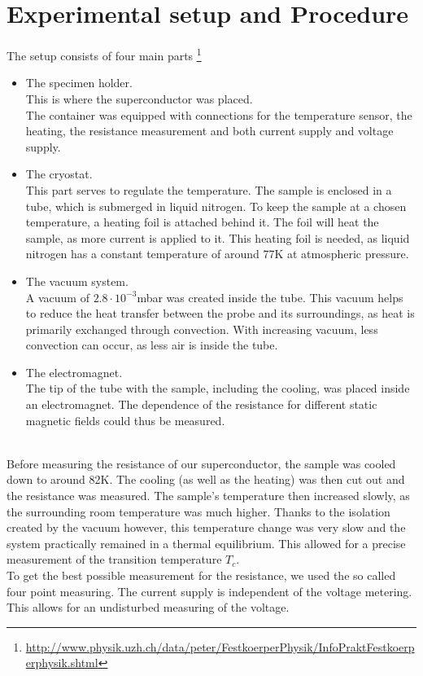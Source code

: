 \documentclass[a4paper,parskip,11pt, DIV12]{scrreprt}
\begin{document}
\chapter{Experimental setup and Procedure}
The setup consists of four main parts \footnote{\url{http://www.physik.uzh.ch/data/peter/FestkoerperPhysik/InfoPraktFestkoerperphysik.shtml}}\\
\begin{itemize}
\item The specimen holder.\\
 This is where the superconductor was placed.\\ The container was equipped with connections for the temperature sensor, the heating, the resistance measurement and both current supply and voltage supply.\\
\item The cryostat.\\
This part serves to regulate the temperature. The sample is enclosed in a tube, which is submerged in liquid nitrogen. To keep the sample at a chosen temperature, a heating foil is attached behind it. The foil will heat the sample, as more current is applied to it. This heating foil is needed, as liquid nitrogen has a constant temperature of around 77K at atmospheric pressure. \\
\item The vacuum system.\\
A vacuum of $2.8 \cdot 10^{-3}$mbar was created inside the tube. This vacuum helps to reduce the heat transfer between the probe and its surroundings, as heat is primarily exchanged through convection. With increasing vacuum, less convection can occur, as less air is inside the tube. 
\item The electromagnet.\\
The tip of the tube with the sample, including the cooling, was placed inside an electromagnet. The dependence of the resistance for different static magnetic fields could thus be measured.
\end{itemize}

~\\
  
Before measuring the resistance of our superconductor, the sample was cooled down to around 82K. The cooling (as well as the heating) was then cut out and the resistance was measured. The sample's temperature then increased slowly, as the surrounding room temperature was much higher. Thanks to the isolation created by the vacuum however, this temperature change was very slow and the system practically remained in a thermal equilibrium. This allowed for a precise measurement of the transition temperature $T_c$.\\
\newpage
To get the best possible measurement for the resistance, we used the so called four point measuring. The current supply is independent of the voltage metering. This allows for an undisturbed measuring of the voltage. 
\end{document}
